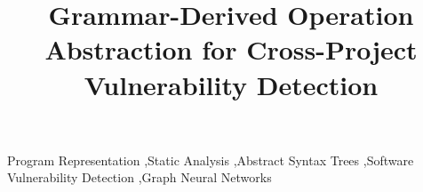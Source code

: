 \documentclass[review]{elsarticle}
\begin{document}
\begin{frontmatter}

\title{Grammar-Derived Operation Abstraction for Cross-Project Vulnerability Detection}

\author{}



\begin{keyword}
Program Representation \sep Static Analysis \sep Abstract Syntax Trees \sep Software Vulnerability Detection \sep Graph Neural Networks
\end{keyword}

\end{frontmatter}

\linenumbers


















\end{document}
